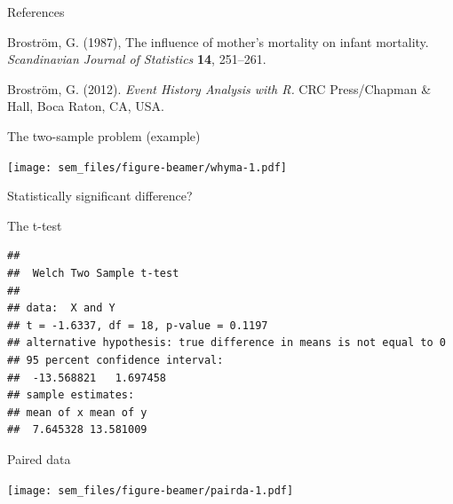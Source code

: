 \begin{frame}{References}

Broström, G. (1987), The influence of mother's mortality on infant
mortality. \emph{Scandinavian Journal of Statistics} \textbf{14},
251--261.

Broström, G. (2012). \emph{Event History Analysis with R.} CRC
Press/Chapman \& Hall, Boca Raton, CA, USA.

\end{frame}

\begin{frame}{The two-sample problem (example)}

\texttt{[image: sem\_files/figure-beamer/whyma-1.pdf]}

Statistically significant difference?

\end{frame}

\begin{frame}[fragile]{The t-test}

\scriptsize

\begin{Shaded}
\begin{Highlighting}[]
\end{Highlighting}
\end{Shaded}

\begin{verbatim}
## 
##  Welch Two Sample t-test
## 
## data:  X and Y
## t = -1.6337, df = 18, p-value = 0.1197
## alternative hypothesis: true difference in means is not equal to 0
## 95 percent confidence interval:
##  -13.568821   1.697458
## sample estimates:
## mean of x mean of y 
##  7.645328 13.581009
\end{verbatim}

\end{frame}

\begin{frame}{Paired data}

\texttt{[image: sem\_files/figure-beamer/pairda-1.pdf]}

\end{frame}

